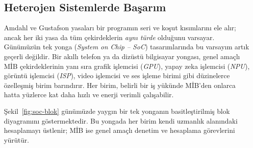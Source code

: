 \subsection{Heterojen Sistemlerde Başarım}
\label{subsec:heterojen-basarim}

Amdahl ve Gustafson yasaları bir programın seri ve koşut kısımlarını ele alır; ancak her iki yasa da tüm çekirdeklerin \emph{aynı türde} olduğunu varsayar. Günümüzün tek yonga (\emph{System on Chip -- SoC}) tasarımlarında bu varsayım artık geçerli değildir. Bir akıllı telefon ya da dizüstü bilgisayar yongası, genel amaçlı MİB çekirdeklerinin yanı sıra grafik işlemcisi (\emph{GPU}), yapay zeka işlemcisi (\emph{NPU}), görüntü işlemcisi (\emph{ISP}), video işlemcisi ve ses işleme birimi gibi düzinelerce özelleşmiş birim barındırır. Her birim, belirli bir iş yükünde MİB'den onlarca hatta yüzlerce kat daha hızlı ve enerji verimli çalışabilir.

Şekil~\ref{fig:soc-blok} günümüzde yaygın bir tek yonganın basitleştirilmiş blok diyagramını göstermektedir. Bu yongada her birim kendi uzmanlık alanındaki hesaplamayı üstlenir; MİB ise genel amaçlı denetim ve hesaplama görevlerini yürütür.


